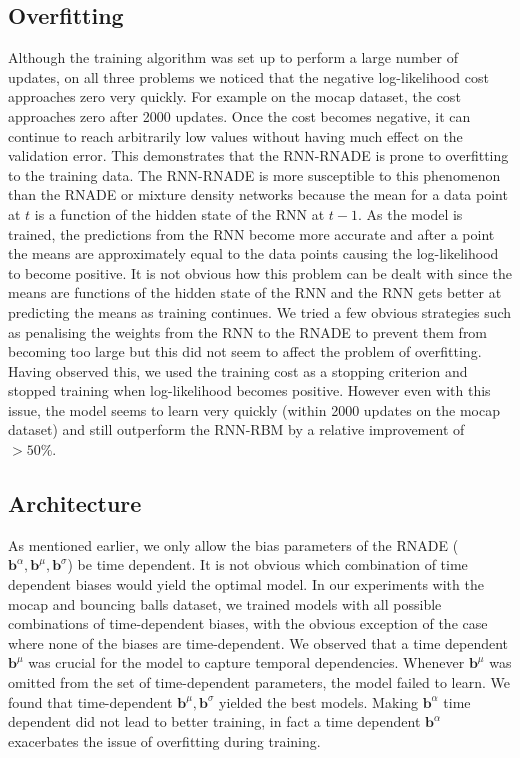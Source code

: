 \documentclass{article} %
\begin{document}
\subsection{Overfitting}
 Although the training algorithm was set up to perform a large number of updates, on all three problems we noticed that the negative log-likelihood cost approaches zero very quickly. For example on the mocap dataset, the cost approaches zero after 2000 updates. Once the cost becomes negative, it can continue to reach arbitrarily low values without having much effect on the validation error. This demonstrates that the RNN-RNADE is prone to overfitting to the training data. The RNN-RNADE is more susceptible to this phenomenon than the RNADE or mixture density networks because the mean for a data point at $t$ is a function of the hidden state of the RNN at $t-1$. As the model is trained, the predictions from the RNN become more accurate and after a point the means are approximately equal to the data points causing the log-likelihood to become positive. It is not obvious how this problem can be dealt with since the means are functions of the hidden state of the RNN and the RNN gets better at predicting the means as training continues. We tried a few obvious strategies such as penalising the weights from the RNN to the RNADE to prevent them from becoming too large but this did not seem to affect the problem of overfitting. Having observed this, we used the training cost as a stopping criterion and stopped training when log-likelihood becomes positive. However even with this issue, the model seems to learn very quickly (within 2000 updates on the mocap dataset) and still outperform the RNN-RBM by a relative improvement of $> 50\%$. 

\subsection{Architecture}

As mentioned earlier, we only allow the bias parameters of the RNADE ($\mathbf{b}^{\alpha},\mathbf{b}^{\mu},\mathbf{b}^{\sigma}$) be time dependent. It is not obvious which combination of time dependent biases would yield the optimal model. In our experiments with the mocap and bouncing balls dataset, we trained models with all possible combinations of time-dependent biases, with the obvious exception of the case where none of the biases are time-dependent. We observed that a time dependent $\mathbf{b}^{\mu}$ was crucial for the model to capture temporal dependencies. Whenever $\mathbf{b}^{\mu}$ was omitted from the set of time-dependent parameters, the model failed to learn. We found that time-dependent $\mathbf{b}^{\mu},\mathbf{b}^{\sigma}$ yielded the best models. Making $\mathbf{b}^{\alpha}$ time dependent did not lead to better training, in fact a time dependent $\mathbf{b}^{\alpha}$ exacerbates the issue of overfitting during training. 
\end{document}
